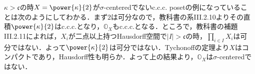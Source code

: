 \documentclass[a4j]{ltjsarticle}
\theoremstyle{definition}
\begin{document}
$\kappa > \mathfrak{c}$の時$X = \power{\kappa}{2}$が$\sigma$-centeredでないc.c.c. posetの例になっていることは次のようにしてわかる．まず$2$は可分なので，教科書の系III.2.10よりその直積$\power{\kappa}{2}$はc.c.c.となり，$\mathbb{O}_{X}$もc.c.c.となる．ところで，教科書の補題III.2.11によれば，$X_i$が二点以上持つHausdorff空間で$|I| > \mathfrak{c}$の時，$\prod_{i \in I} X_i$は可分ではない．よって$\power{\kappa}{2}$は可分ではない．Tychonoffの定理より$X$はコンパクトであり，Hausdorff性も明らか．よって上の結果より，$\mathbb{O}_X$は$\sigma$-centeredではない．

\nocite{Kunen:2011,Matsuzaka:1968,Sakai:2012}
\printbibliography[title=参考文献]
\end{document}
